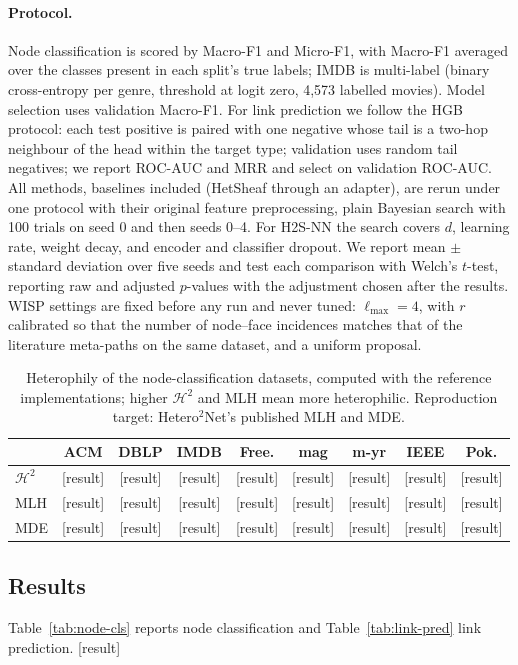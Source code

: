 \documentclass{article}
\newcommand{\method}{\textsc{H2S-NN}}
\newcommand{\wisp}{\textsc{WISP}}
\newcommand{\res}{{\scriptsize[result]}}
\begin{document}
\paragraph{Protocol.} Node classification is scored by Macro-F1 and Micro-F1, with Macro-F1 averaged over the classes present in each split's true labels; IMDB is multi-label (binary cross-entropy per genre, threshold at logit zero, 4,573 labelled movies). Model selection uses validation Macro-F1. For link prediction we follow the HGB protocol: each test positive is paired with one negative whose tail is a two-hop neighbour of the head within the target type; validation uses random tail negatives; we report ROC-AUC and MRR and select on validation ROC-AUC. All methods, baselines included (HetSheaf through an adapter), are rerun under one protocol with their original feature preprocessing, plain Bayesian search with 100 trials on seed 0 and then seeds 0--4. For \method{} the search covers $d$, learning rate, weight decay, and encoder and classifier dropout. We report mean $\pm$ standard deviation over five seeds and test each comparison with Welch's $t$-test, reporting raw and adjusted $p$-values with the adjustment chosen after the results. \wisp{} settings are fixed before any run and never tuned: $\ell_{\max}=4$, with $r$ calibrated so that the number of node--face incidences matches that of the literature meta-paths on the same dataset, and a uniform proposal.

\begin{table}[t]
  \centering
  \caption{Heterophily of the node-classification datasets, computed with the reference implementations; higher $\mathcal{H}^2$ and MLH mean more heterophilic. Reproduction target: Hetero$^2$Net's published MLH and MDE.}
  \label{tab:hetero}
  \footnotesize
  \setlength{\tabcolsep}{2.4pt}
  \begin{tabular}{lcccccccc}
    \toprule
    & ACM & DBLP & IMDB & Free. & mag & m-yr & IEEE & Pok. \\
    \midrule
    $\mathcal{H}^2$ & \res & \res & \res & \res & \res & \res & \res & \res \\
    MLH & \res & \res & \res & \res & \res & \res & \res & \res \\
    MDE & \res & \res & \res & \res & \res & \res & \res & \res \\
    \bottomrule
  \end{tabular}
\end{table}

\subsection{Results}
\label{sec:results}
Table~\ref{tab:node-cls} reports node classification and Table~\ref{tab:link-pred} link prediction. \res{}
\end{document}

